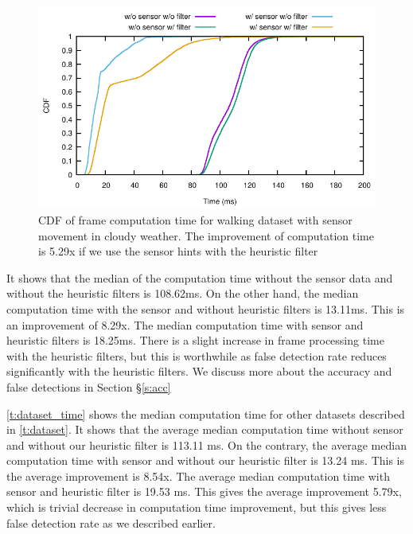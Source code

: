\begin{figure}[ht]
\centering
\includegraphics[width=5.2in]{plots/cloudy_cdf.pdf}
\caption{CDF of frame computation time for walking dataset with sensor movement in cloudy weather. The improvement of computation time is 5.29x if we use the sensor hints with the heuristic filter}
\label{f:cdf_cloudy}
\end{figure}

It shows that the median of the computation time without the sensor data and without the heuristic filters is 108.62ms.
On the other hand, the median computation time with the sensor and without heuristic filters is 13.11ms.
This is an improvement of 8.29x.
The median computation time with sensor and heuristic filters is 18.25ms.
There is a slight increase in frame processing time with the heuristic filters, but this is worthwhile as false detection rate reduces significantly with the heuristic filters.  
We discuss more about the accuracy and false detections in Section \S\ref{s:acc}

\ref{t:dataset_time} shows the median computation time for other datasets described in \ref{t:dataset}.
It shows that the average median computation time without sensor and without our heuristic filter is 113.11 ms.
On the contrary, the average median computation time with sensor and without our heuristic filter is 13.24 ms.
This is the average improvement is 8.54x.
The average median computation time with sensor and heuristic filter is 19.53 ms.
This gives the average improvement 5.79x, which is trivial decrease in computation time improvement, but this gives less false detection rate as we described earlier.

